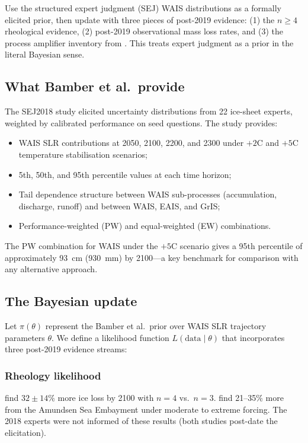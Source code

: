 \documentclass[11pt]{article}
\begin{document}
Use the \citet{bamber2019ice} structured expert judgment (SEJ) WAIS distributions as a formally elicited prior, then update with three pieces of post-2019 evidence: (1) the $n \geq 4$ rheological evidence, (2) post-2019 observational mass loss rates, and (3) the process amplifier inventory from \citet{fricker2025antarctica}.  This treats expert judgment as a prior in the literal Bayesian sense.

\subsection{What Bamber et al.\ provide}

The SEJ2018 study elicited uncertainty distributions from 22 ice-sheet experts, weighted by calibrated performance on seed questions.  The study provides:
\begin{itemize}
  \item WAIS SLR contributions at 2050, 2100, 2200, and 2300 under $+2$\textdegree C and $+5$\textdegree C temperature stabilisation scenarios;
  \item 5th, 50th, and 95th percentile values at each time horizon;
  \item Tail dependence structure between WAIS sub-processes (accumulation, discharge, runoff) and between WAIS, EAIS, and GrIS;
  \item Performance-weighted (PW) and equal-weighted (EW) combinations.
\end{itemize}

The PW combination for WAIS under the $+5$\textdegree C scenario gives a 95th percentile of approximately 93~cm (930~mm) by 2100---a key benchmark for comparison with any alternative approach.

\subsection{The Bayesian update}

Let $\pi(\theta)$ represent the Bamber et al.\ prior over WAIS SLR trajectory parameters $\theta$.  We define a likelihood function $L(\text{data} \mid \theta)$ that incorporates three post-2019 evidence streams:

\subsubsection{Rheology likelihood}

\citet{getraer2025increasing} find $32 \pm 14\%$ more ice loss by 2100 with $n = 4$ vs.\ $n = 3$.  \citet{martin2025wrongn} find 21--35\% more from the Amundsen Sea Embayment under moderate to extreme forcing.  The 2018 experts were not informed of these results (both studies post-date the elicitation).
\end{document}
